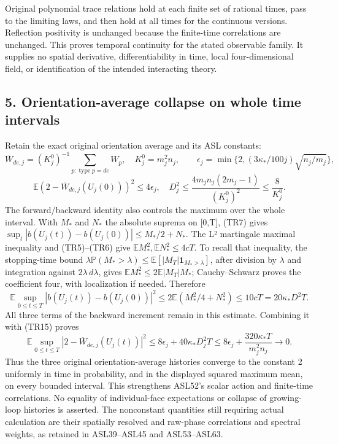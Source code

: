 \documentclass[11pt]{article}
\begin{document}
Original polynomial trace relations hold at each finite set of rational times, pass to the limiting laws, and then hold at all times for the continuous versions. Reflection positivity is unchanged because the finite-time correlations are unchanged. This proves temporal continuity for the stated observable family. It supplies no spatial derivative, differentiability in time, local four-dimensional field, or identification of the intended interacting theory.

\subsection*{5. Orientation-average collapse on whole time intervals}

Retain the exact original orientation average and its ASL constants:
\[
 \overline W_{de,j}=(K_j^0)^{-1}\sum_{p:\operatorname{type}p=de}W_p,
 \quad K_j^0=m_j^2n_j,\qquad
 \epsilon_j=\min\{2,(3\kappa_*/100j)\sqrt{n_j/m_j}\},
\]
\[
 \mathbb E(2-\overline W_{de,j}(U_j(0)))^2\le4\epsilon_j,
 \quad D_j^2\le\frac{4m_jn_j(2m_j-1)}{(K_j^0)^2}\le\frac8{K_j^0}.
 \tag{TR15}
\]
The forward/backward identity also controls the maximum over the whole interval. With \(M_*\) and \(N_*\) the absolute suprema on [0,T], (TR7) gives
\(\sup_t|b(U_j(t))-b(U_j(0))|\le M_*/2+N_*\).
The L² martingale maximal inequality and (TR5)–(TR6) give \(\mathbb EM_*^2,\mathbb EN_*^2\le4cT\). To recall that inequality, the stopping-time bound \(\lambda\mathbb P(M_*>\lambda)\le\mathbb E[|M_T|\mathbf1_{M_*>\lambda}]\), after division by \(\lambda\) and integration against \(2\lambda\,d\lambda\), gives \(\mathbb EM_*^2\le2\mathbb E|M_T|M_*\); Cauchy–Schwarz proves the coefficient four, with localization if needed. Therefore
\[
 \mathbb E\sup_{0\le t\le T}|b(U_j(t))-b(U_j(0))|^2
 \le 2\mathbb E(M_*^2/4+N_*^2)
 \le10cT=20\kappa_*D^2T.
 \tag{TR16}
\]
All three terms of the backward increment remain in this estimate. Combining it with (TR15) proves
\[
 \boxed{\quad
 \mathbb E\sup_{0\le t\le T}|2-\overline W_{de,j}(U_j(t))|^2
 \le8\epsilon_j+40\kappa_*D_j^2T
 \le8\epsilon_j+\frac{320\kappa_*T}{m_j^2n_j}
 \longrightarrow0.\quad}\tag{TR17}
\]
Thus the three original orientation-average histories converge to the constant 2 uniformly in time in probability, and in the displayed squared maximum mean, on every bounded interval. This strengthens ASL52's scalar action and finite-time correlations. No equality of individual-face expectations or collapse of growing-loop histories is asserted. The nonconstant quantities still requiring actual calculation are their spatially resolved and raw-phase correlations and spectral weights, as retained in ASL39–ASL45 and ASL53–ASL63.
\end{document}
